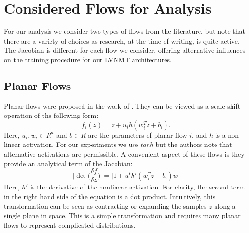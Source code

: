 


\section{Considered Flows for Analysis}

For our analysis we consider two types of flows from the literature, but note that there are a variety of choices as research, at the time of writing, is quite active. The Jacobian is different for each flow we consider, offering alternative influences on the training procedure for our \ac{LVNMT} architectures. 

\subsection{Planar Flows}

Planar flows were proposed in the work of \citet{rezende2015VIwithNF}. They can be viewed as a scale-shift operation of the following form:
\begin{equation}
f_{i}(z) = z + u_{i} h(w_{i}^{T} z + b_{i}).
\end{equation}
Here, $u_{i}, w_{i} \in R^{d}$ and $b \in R$ are the parameters of planar flow $i$, and $h$ is a non-linear activation. For our experiments we use \textit{tanh} but the authors note that alternative activations are permissible. A convenient aspect of these flows is they provide an analytical term of the Jacobian:
\begin{equation}
\bigg| \det \bigg( \frac{\delta f}{\delta z} \bigg)\bigg|  = \bigg| 1 + u^{t} h'(w_{i}^{T} z + b_{i})w \bigg|
\end{equation} 
Here, $h'$ is the derivative of the nonlinear activation. For clarity, the second term in the right hand side of the equation is a dot product. Intuitively, this transformation can be seen as contracting or expanding the samples $z$ along a single plane in space. This is a simple transformation and requires many planar flows to represent complicated distributions.  %

